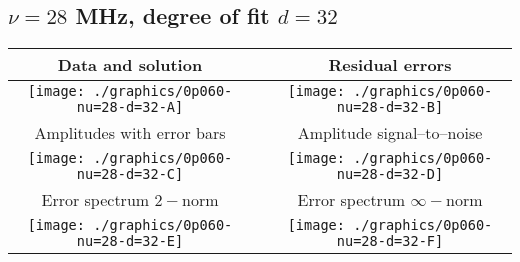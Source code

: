 

% 

\clearpage{}
\break{}

\subsection{$\nu = 28$ MHz, degree of fit $d = 32$}

\begin{table}[h]
    \begin{center}
        \begin{tabular}{ccc}
            Data and solution & \quad & Residual errors \\\hline
            \texttt{[image: ./graphics/0p060-nu=28-d=32-A]} &&
            \texttt{[image: ./graphics/0p060-nu=28-d=32-B]} \\[15pt]
            Amplitudes with error bars && Amplitude signal--to--noise \\\hline
            \texttt{[image: ./graphics/0p060-nu=28-d=32-C]} &&
            \texttt{[image: ./graphics/0p060-nu=28-d=32-D]} \\[15pt]
            Error spectrum $2-$norm && Error spectrum $\infty-$norm \\\hline
            \texttt{[image: ./graphics/0p060-nu=28-d=32-E]} &&
            \texttt{[image: ./graphics/0p060-nu=28-d=32-F]} \\[15pt]
        \end{tabular}
    \end{center}
\label{fig:elev=60, nu=28}
\end{table}



\endinput
